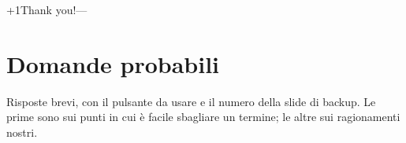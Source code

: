 \begin{slidepag}{\the\numexpr{}+1\relax}{Thank you!}{---}
\end{slidepag}

\section*{Domande probabili}

Risposte brevi, con il pulsante da usare e il numero della slide di backup. Le prime sono sui punti in cui è facile sbagliare un termine; le altre sui ragionamenti nostri.

